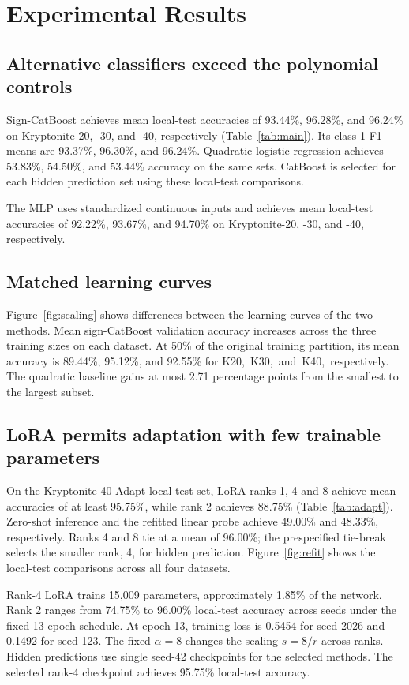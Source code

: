 \documentclass{article}
\begin{document}
\section{Experimental Results}
\subsection{Alternative classifiers exceed the polynomial controls}
Sign-CatBoost achieves mean local-test accuracies of 93.44\%, 96.28\%, and 96.24\% on Kryptonite-20, -30, and -40, respectively (Table~\ref{tab:main}). Its class-1 F1 means are 93.37\%, 96.30\%, and 96.24\%. Quadratic logistic regression achieves 53.83\%, 54.50\%, and 53.44\% accuracy on the same sets. CatBoost is selected for each hidden prediction set using these local-test comparisons.




The MLP uses standardized continuous inputs and achieves mean local-test accuracies of 92.22\%, 93.67\%, and 94.70\% on Kryptonite-20, -30, and -40, respectively.

\subsection{Matched learning curves}
Figure~\ref{fig:scaling} shows differences between the learning curves of the two methods. Mean sign-CatBoost validation accuracy increases across the three training sizes on each dataset. At 50\% of the original training partition, its mean accuracy is 89.44\%, 95.12\%, and 92.55\% for \mbox{K20, K30, and K40, respectively.} The quadratic baseline gains at most 2.71 percentage points from the smallest to the largest subset.

\subsection{LoRA permits adaptation with few trainable parameters}
On the Kryptonite-40-Adapt local test set, LoRA ranks 1, 4 and 8 achieve mean accuracies of at least 95.75\%, while rank 2 achieves 88.75\% (Table~\ref{tab:adapt}). Zero-shot inference and the refitted linear probe achieve 49.00\% and 48.33\%, respectively. Ranks 4 and 8 tie at a mean of 96.00\%; the prespecified tie-break selects the smaller rank, 4, for hidden prediction. Figure~\ref{fig:refit} shows the local-test comparisons across all four datasets.



Rank-4 LoRA trains 15,009 parameters, approximately 1.85\% of the network. Rank 2 ranges from 74.75\% to 96.00\% local-test accuracy across seeds under the fixed 13-epoch schedule. At epoch 13, training loss is 0.5454 for seed 2026 and 0.1492 for seed 123. The fixed $\alpha=8$ changes the scaling $s=8/r$ across ranks. Hidden predictions use single seed-42 checkpoints for the selected methods. The selected rank-4 checkpoint achieves 95.75\% local-test accuracy.
\end{document}
